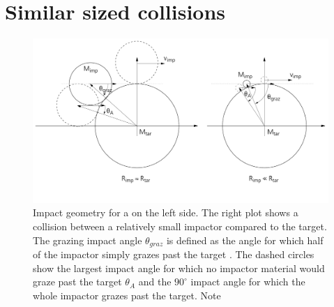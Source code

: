 \newpage
\chapter{Similar sized collisions}
\graphicspath{{./03figs/}}




\begin{figure}[htbp]
\begin{center}
\includegraphics[scale=0.4]{03_grazing}
\caption{Impact geometry for a \SSC on the left side. The right plot shows a collision between a relatively small impactor compared to the target. The grazing impact angle $\theta_{graz}$ is defined as the angle for which half of the impactor simply grazes past the target \citep{Asphaug:2010p3539}. The dashed circles show the largest impact angle for which no impactor material would graze past the target $\theta_A$ and the $90^\circ$ impact angle for which the whole impactor grazes past the target. Note }
\label{ch03_fig01}
\end{center}
\end{figure}


